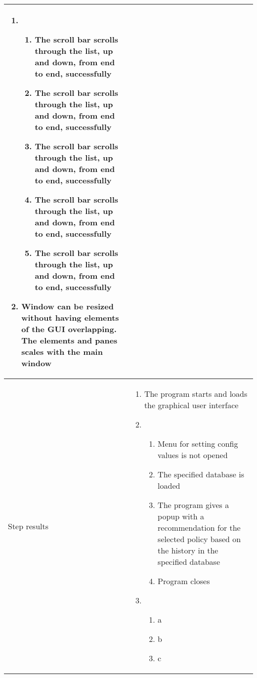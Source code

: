 \documentclass[10pt]{article}
\begin{document}
\begin{center}
\begin{longtable}{ | p{4cm} | p{10cm} | }
\begin{enumerate}
							\item 
							\begin{enumerate}
								\item The scroll bar scrolls through the list, up and down, from end to end, successfully
								\item The scroll bar scrolls through the list, up and down, from end to end, successfully
								\item The scroll bar scrolls through the list, up and down, from end to end, successfully
								\item The scroll bar scrolls through the list, up and down, from end to end, successfully									\item The scroll bar scrolls through the list, up and down, from end to end, successfully
							\end{enumerate}

							\item Window can be resized without having elements of the GUI overlapping. The elements and panes scales with the main window
						\end{enumerate}
							 \\  [3pt] \hline

			Step results & 	\begin{enumerate}
							\item The program starts and loads the graphical user interface

							\item  
							\begin{enumerate}
								\item Menu for setting config values is not opened
								\item The specified database is loaded
								\item The program gives a popup with a recommendation for the selected policy based on the history in the specified database
								\item Program closes
							\end{enumerate}
							
							\item
							\begin{enumerate}
								\item a
								\item b
								\item c
							\end{enumerate}


\end{enumerate}
\end{longtable}
\end{center}
\end{document}
